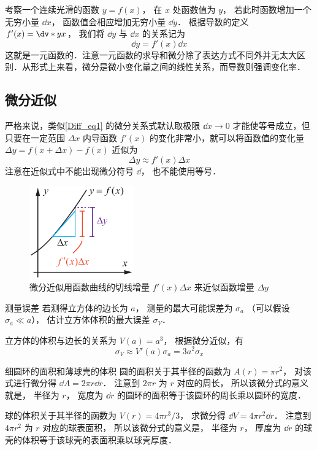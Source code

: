 

考察一个连续光滑的函数 $y = f(x)$， 在 $x$ 处函数值为 $y$， 若此时函数增加一个无穷小量 $\dd{x}$， 函数值会相应增加无穷小量 $\dd{y}$． 根据导数的定义 $f'(x) = \dv*{y}{x}$， 我们将 $\dd{y}$ 与 $\dd{x}$ 的关系记为
\begin{equation}\label{Diff_eq1}
\dd{y} = f'(x) \dd{x}
\end{equation}
这就是一元函数的．注意一元函数的求导和微分除了表达方式不同外并无太大区别．从形式上来看，微分是微小变化量之间的线性关系，而导数则强调变化率．

\subsection{微分近似}
严格来说，类似\autoref{Diff_eq1} 的微分关系式默认取极限 $\dd{x} \to 0$ 才能使等号成立，但只要在一定范围 $\Delta x$ 内导函数 $f'(x)$ 的变化非常小，就可以将函数值的变化量 $\Delta y = f(x+\Delta x)-f(x)$ 近似为
\begin{equation}
\Delta y \approx f'(x) \Delta x
\end{equation}
注意在近似式中不能出现微分符号 $\dd$， 也不能使用等号．

\begin{figure}[ht]
\centering
\includegraphics[width=4.5cm]{./figures/Diff.pdf}
\caption{微分近似用函数曲线的切线增量 $f'(x)\Delta x$ 来近似函数增量 $\Delta y$} \label{Diff_fig1}
\end{figure}

\begin{exam}{测量误差}\label{Diff_ex1}
若测得立方体的边长为 $a$， 测量的最大可能误差为 $\sigma_a$ （可以假设 $\sigma_a \ll a$）， 估计立方体体积的最大误差 $\sigma_V$．

立方体的体积与边长的关系为 $V(a)=a^3$， 根据微分近似，有
\begin{equation}
\sigma_V \approx V'(a) \sigma_a = 3a^2 \sigma_x
\end{equation}
\end{exam}

\begin{exam}{细圆环的面积和薄球壳的体积}\label{Diff_ex2}
圆的面积关于其半径的函数为 $A(r) = \pi r^2$， 对该式进行微分得 $\dd{A} = 2\pi r\dd{r}$． 注意到 $2\pi r$ 为 $r$ 对应的周长， 所以该微分式的意义就是， 半径为 $r$， 宽度为 $\dd{r}$ 的圆环的面积等于该圆环的周长乘以圆环的宽度．

球的体积关于其半径的函数为 $V(r) = 4\pi r^3/3$， 求微分得 $\dd{V} = 4\pi r^2 \dd{r}$． 注意到 $4\pi r^2$ 为 $r$ 对应的球表面积， 所以该微分式的意义是， 半径为 $r$， 厚度为 $\dd{r}$ 的球壳的体积等于该球壳的表面积乘以球壳厚度．
\end{exam}


